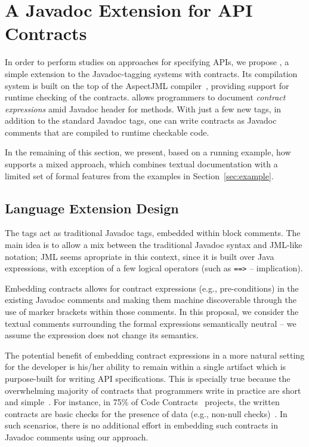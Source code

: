\section{A Javadoc Extension for API Contracts}
\label{sec:approach}

In order to perform studies on approaches for specifying APIs, we propose \contractjdoc{}, a simple extension to the Javadoc-tagging systems with contracts. 
Its compilation system is built on the top of the AspectJML compiler~\cite{aspectjml}, providing support for runtime checking of the contracts.
\contractjdoc{} allows programmers to document \emph{contract expressions} amid Javadoc header for methods. With just a few new tags, in addition to the standard Javadoc tags, one can write contracts as Javadoc comments that are compiled to runtime checkable code. 

In the remaining of this section, we present, based on a running example, how \contractjdoc{} supports a mixed approach, which combines textual documentation with a limited set of formal features from the examples in Section~\ref{sec:example}.

\subsection{Language Extension Design}

The \contractjdoc{} tags act as traditional Javadoc tags,  embedded within block comments. 
The main idea is to allow a mix between the traditional Javadoc syntax and JML-like notation; 
JML seems apropriate in this context, since it is built over Java expressions, with exception of a few logical operators (such as \texttt{==>} -- implication).

Embedding contracts allows for contract expressions (e.g., pre-conditions) in the existing Javadoc comments
and making them machine discoverable through the use of
marker brackets within those comments.
In this proposal, we consider the textual comments surrounding the formal expressions semantically neutral -- we assume the expression does not change its semantics. 

The potential benefit of embedding contract expressions in a more natural setting for the developer is his/her ability to remain within a single artifact which is purpose-built for writing API specifications. 
This is specially true because the overwhelming majority of contracts that programmers write in
practice are short and simple~\cite{Estler-etal14,typeContracts}. For instance, in 75\% of Code Contracts~\cite{codeContractsPaper} projects, the written contracts are basic checks for the presence of data (e.g., non-null checks)~\cite{typeContracts}. In such scenarios, there is no additional effort in embedding such contracts in Javadoc comments using our \contractjdoc{} approach.

